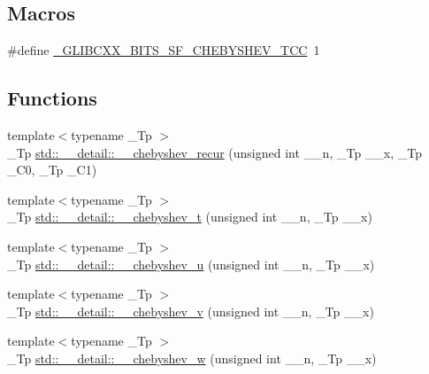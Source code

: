 \subsection*{Macros}
\begin{DoxyCompactItemize}
\item 
\#define \hyperlink{sf__chebyshev_8tcc_af93a8a3778aadae3937c7f4b1aa86123}{\+\_\+\+G\+L\+I\+B\+C\+X\+X\+\_\+\+B\+I\+T\+S\+\_\+\+S\+F\+\_\+\+C\+H\+E\+B\+Y\+S\+H\+E\+V\+\_\+\+T\+CC}~1
\end{DoxyCompactItemize}
\subsection*{Functions}
\begin{DoxyCompactItemize}
\item 
{\footnotesize template$<$typename \+\_\+\+Tp $>$ }\\\+\_\+\+Tp \hyperlink{namespacestd_1_1____detail_a3a893b4c60f3245af5db4ca792c4b2cf}{std\+::\+\_\+\+\_\+detail\+::\+\_\+\+\_\+chebyshev\+\_\+recur} (unsigned int \+\_\+\+\_\+n, \+\_\+\+Tp \+\_\+\+\_\+x, \+\_\+\+Tp \+\_\+\+C0, \+\_\+\+Tp \+\_\+\+C1)
\item 
{\footnotesize template$<$typename \+\_\+\+Tp $>$ }\\\+\_\+\+Tp \hyperlink{namespacestd_1_1____detail_af4ba1015e914cdd23d9e5d2be69740c1}{std\+::\+\_\+\+\_\+detail\+::\+\_\+\+\_\+chebyshev\+\_\+t} (unsigned int \+\_\+\+\_\+n, \+\_\+\+Tp \+\_\+\+\_\+x)
\item 
{\footnotesize template$<$typename \+\_\+\+Tp $>$ }\\\+\_\+\+Tp \hyperlink{namespacestd_1_1____detail_aa3289db0a53f55007bc10dc94f15c1f7}{std\+::\+\_\+\+\_\+detail\+::\+\_\+\+\_\+chebyshev\+\_\+u} (unsigned int \+\_\+\+\_\+n, \+\_\+\+Tp \+\_\+\+\_\+x)
\item 
{\footnotesize template$<$typename \+\_\+\+Tp $>$ }\\\+\_\+\+Tp \hyperlink{namespacestd_1_1____detail_a684b312a311bbe2065a2633220f4507d}{std\+::\+\_\+\+\_\+detail\+::\+\_\+\+\_\+chebyshev\+\_\+v} (unsigned int \+\_\+\+\_\+n, \+\_\+\+Tp \+\_\+\+\_\+x)
\item 
{\footnotesize template$<$typename \+\_\+\+Tp $>$ }\\\+\_\+\+Tp \hyperlink{namespacestd_1_1____detail_ae220390e755bdc4908e040fd68426d14}{std\+::\+\_\+\+\_\+detail\+::\+\_\+\+\_\+chebyshev\+\_\+w} (unsigned int \+\_\+\+\_\+n, \+\_\+\+Tp \+\_\+\+\_\+x)
\end{DoxyCompactItemize}


